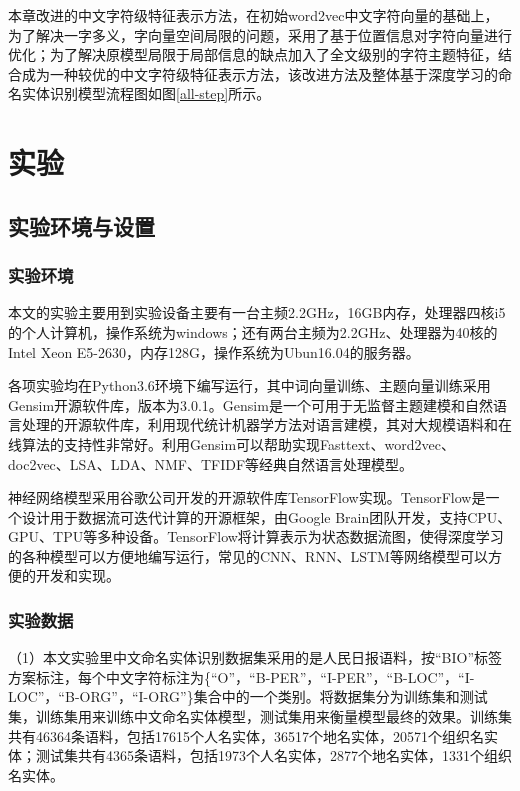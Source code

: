 \documentclass[winfonts,master,oneside,nobackinfo]{njuthesis}
\begin{document}
本章改进的中文字符级特征表示方法，在初始word2vec中文字符向量的基础上，为了解决一字多义，字向量空间局限的问题，采用了基于位置信息对字符向量进行优化；为了解决原模型局限于局部信息的缺点加入了全文级别的字符主题特征，结合成为一种较优的中文字符级特征表示方法，该改进方法及整体基于深度学习的命名实体识别模型流程图如图\ref{all-step}所示。



\section{实验}

\subsection{实验环境与设置}

\subsubsection{实验环境}

本文的实验主要用到实验设备主要有一台主频2.2GHz，16GB内存，处理器四核i5的个人计算机，操作系统为windows；还有两台主频为2.2GHz、处理器为40核的Intel Xeon E5-2630，内存128G，操作系统为Ubun16.04的服务器。

各项实验均在Python3.6环境下编写运行，其中词向量训练、主题向量训练采用Gensim开源软件库，版本为3.0.1。Gensim是一个可用于无监督主题建模和自然语言处理的开源软件库，利用现代统计机器学方法对语言建模，其对大规模语料和在线算法的支持性非常好。利用Gensim可以帮助实现Fasttext、word2vec、doc2vec、LSA、LDA、NMF、TFIDF等经典自然语言处理模型。

神经网络模型采用谷歌公司开发的开源软件库TensorFlow\cite{TensorFlow}实现。TensorFlow是一个设计用于数据流可迭代计算的开源框架，由Google Brain团队开发，支持CPU、GPU、TPU等多种设备。TensorFlow将计算表示为状态数据流图，使得深度学习的各种模型可以方便地编写运行，常见的CNN、RNN、LSTM等网络模型可以方便的开发和实现。

\subsubsection{实验数据}

（1）本文实验里中文命名实体识别数据集采用的是人民日报语料，按“BIO”标签方案标注，每个中文字符标注为\{“O”，“B-PER”，“I-PER”，“B-LOC”，“I-LOC”，“B-ORG”，“I-ORG”\}集合中的一个类别。将数据集分为训练集和测试集，训练集用来训练中文命名实体模型，测试集用来衡量模型最终的效果。训练集共有46364条语料，包括17615个人名实体，36517个地名实体，20571个组织名实体；测试集共有4365条语料，包括1973个人名实体，2877个地名实体，1331个组织名实体。
\end{document}
